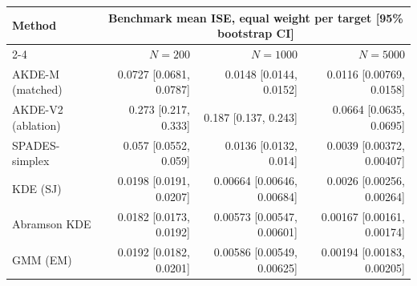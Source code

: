 \begin{tabular}{lrrr}
\toprule
Method & \multicolumn{3}{c}{Benchmark mean ISE, equal weight per target [95\% bootstrap CI]} \\
\cmidrule(lr){2-4}
 & $N=200$ & $N=1000$ & $N=5000$ \\
\midrule
AKDE-M (matched) & 0.0727 [0.0681, 0.0787] & 0.0148 [0.0144, 0.0152] & 0.0116 [0.00769, 0.0158] \\
AKDE-V2 (ablation) & 0.273 [0.217, 0.333] & 0.187 [0.137, 0.243] & 0.0664 [0.0635, 0.0695] \\
SPADES-simplex & 0.057 [0.0552, 0.059] & 0.0136 [0.0132, 0.014] & 0.0039 [0.00372, 0.00407] \\
KDE (SJ) & 0.0198 [0.0191, 0.0207] & 0.00664 [0.00646, 0.00684] & 0.0026 [0.00256, 0.00264] \\
Abramson KDE & 0.0182 [0.0173, 0.0192] & 0.00573 [0.00547, 0.00601] & 0.00167 [0.00161, 0.00174] \\
GMM (EM) & 0.0192 [0.0182, 0.0201] & 0.00586 [0.00549, 0.00625] & 0.00194 [0.00183, 0.00205] \\
\bottomrule
\end{tabular}